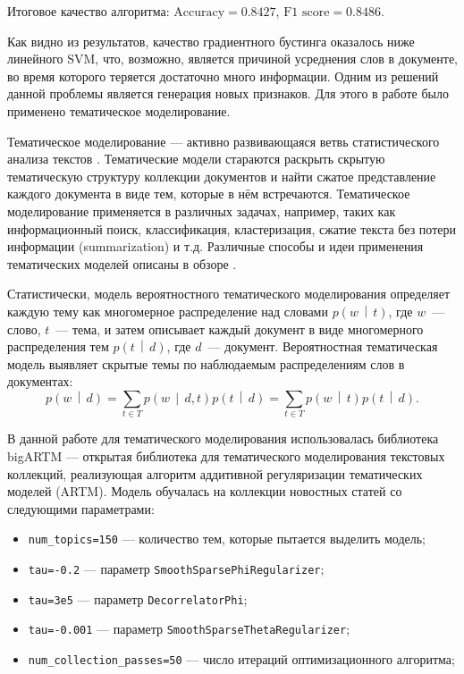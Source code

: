 \documentclass[a4paper, 14pt]{extarticle}
\begin{document}
Итоговое качество алгоритма: $\text{Accuracy} = 0.8427$, $\text{F1 score} = 0.8486$.

Как видно из результатов, качество градиентного бустинга оказалось ниже линейного SVM, что, возможно, является причиной усреднения слов в документе,
во время которого теряется достаточно много информации. Одним из решений данной проблемы является генерация новых признаков. Для этого 
в работе было применено тематическое моделирование.

Тематическое моделирование --- активно развивающаяся ветвь статистического анализа текстов \cite{Blei:2012:PTM:2133806.2133826}. Тематические
модели стараются раскрыть скрытую тематическую структуру коллекции документов и найти сжатое представление каждого документа в виде
тем, которые в нём встречаются. Тематическое моделирование применяется в различных задачах, например, таких как информационный поиск,
классификация, кластеризация, сжатие текста без потери информации (summarization) и т.д. Различные способы и идеи применения тематических моделей
описаны в обзоре \cite{Daud2010}.

Статистически, модель вероятностного тематического моделирования определяет каждую тему как многомерное распределение над словами
$p\left(w \,\middle|\, t\right)$, где $w$~--- слово, $t$~--- тема, и затем описывает каждый документ в виде многомерного распределения тем $p\left(t \,\middle|\, d\right)$, где $d$~--- документ. Вероятностная тематическая модель выявляет скрытые темы по наблюдаемым распределениям слов в документах:
$$
p\left(w \,\middle|\, d\right) = \sum_{t \in T} p\left(w \,\middle|\, d, t\right) p\left(t \,\middle|\, d\right) = \sum_{t \in T} p\left(w \,\middle|\, t\right) p\left(t \,\middle|\, d\right).
$$

В данной работе для тематического моделирования использовалась библиотека bigARTM \cite{bigartm} --- открытая библиотека для тематического 
моделирования текстовых коллекций, реализующая алгоритм аддитивной регуляризации тематических моделей (ARTM). Модель обучалась на коллекции
новостных статей со следующими параметрами:
\begin{itemize}
	\item \verb|num_topics=150| --- количество тем, которые пытается выделить модель;
	\item \verb|tau=-0.2| --- параметр \verb|SmoothSparsePhiRegularizer|;
	\item \verb|tau=3e5| --- параметр \verb|DecorrelatorPhi|;
	\item \verb|tau=-0.001| --- параметр \verb|SmoothSparseThetaRegularizer|;
	\item \verb|num_collection_passes=50| --- число итераций оптимизационного алгоритма;
\end{itemize}
\end{document}
